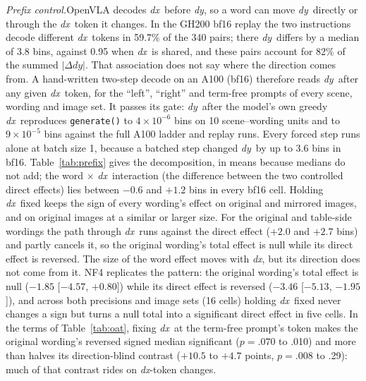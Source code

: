 \documentclass[conference]{IEEEtran}
\newcommand{\dy}{\textit{dy}}
\newcommand{\dx}{\textit{dx}}
\newcommand{\head}[1]{\textit{#1}\hspace{0.4em}}
\begin{document}
\head{Prefix control.}OpenVLA decodes \dx\ before \dy, so a word can move \dy\ directly or through the \dx\ token it changes. In the GH200 bf16 replay the two instructions decode different \dx\ tokens in 59.7\% of the 340 pairs; there \dy\ differs by a median of 3.8 bins, against 0.95 when \dx\ is shared, and these pairs account for 82\% of the summed $|\Delta\dy|$. That association does not say where the direction comes from. A hand-written two-step decode on an A100 (bf16) therefore reads \dy\ after any given \dx\ token, for the ``left'', ``right'' and term-free prompts of every scene, wording and image set. It passes its gate: \dy\ after the model's own greedy \dx\ reproduces \texttt{generate()} to $4\times10^{-6}$ bins on 10 scene--wording units and to $9\times10^{-5}$ bins against the full A100 ladder and replay runs. Every forced step runs alone at batch size 1, because a batched step changed \dy\ by up to 3.6 bins in bf16. Table~\ref{tab:prefix} gives the decomposition, in means because medians do not add; the word $\times$ \dx\ interaction (the difference between the two controlled direct effects) lies between $-0.6$ and $+1.2$ bins in every bf16 cell. Holding \dx\ fixed keeps the sign of every wording's effect on original and mirrored images, and on original images at a similar or larger size. For the original and table-side wordings the path through \dx\ runs against the direct effect ($+2.0$ and $+2.7$ bins) and partly cancels it, so the original wording's total effect is null while its direct effect is reversed. The size of the word effect moves with \dx, but its direction does not come from it. NF4 replicates the pattern: the original wording's total effect is null ($-1.85$ [$-4.57$, $+0.80$]) while its direct effect is reversed ($-3.46$ [$-5.13$, $-1.95$]), and across both precisions and image sets (16 cells) holding \dx\ fixed never changes a sign but turns a null total into a significant direct effect in five cells. In the terms of Table~\ref{tab:oat}, fixing \dx\ at the term-free prompt's token makes the original wording's reversed signed median significant ($p=.070$ to .010) and more than halves its direction-blind contrast ($+10.5$ to $+4.7$ points, $p=.008$ to .29): much of that contrast rides on \dx-token changes.
\end{document}
